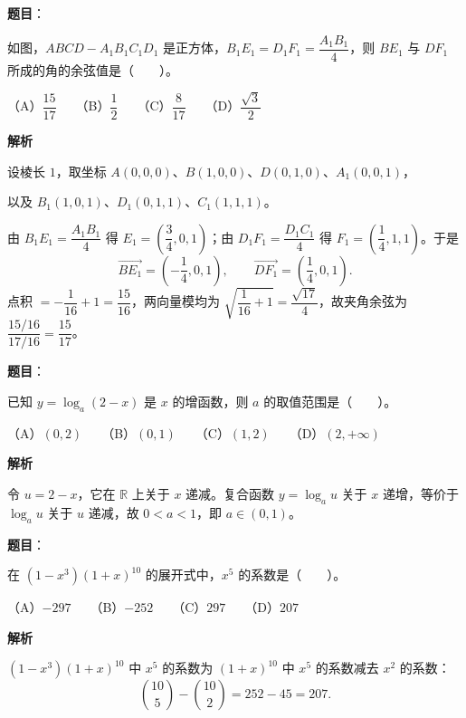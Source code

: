 \begin{answer}

\textbf{题目}：

如图，$ABCD-A_1B_1C_1D_1$ 是正方体，$B_1E_1=D_1F_1=\dfrac{A_1B_1}{4}$，则 $BE_1$ 与 $DF_1$ 所成的角的余弦值是\mbox{（　　）}。
\nopagebreak[4]
\begin{center}\end{center}
\nopagebreak[4]
（A）$\dfrac{15}{17}$　　（B）$\dfrac12$　　（C）$\dfrac8{17}$　　（D）$\dfrac{\sqrt3}{2}$

\textbf{解析}

设棱长 $1$，取坐标 $A(0,0,0)$、$B(1,0,0)$、$D(0,1,0)$、$A_1(0,0,1)$，

以及 $B_1(1,0,1)$、$D_1(0,1,1)$、$C_1(1,1,1)$。

由 $B_1E_1=\dfrac{A_1B_1}{4}$ 得 $E_1=\left(\dfrac34,0,1\right)$；由 $D_1F_1=\dfrac{D_1C_1}{4}$ 得 $F_1=\left(\dfrac14,1,1\right)$。于是
\nopagebreak[4]
\[\overrightarrow{BE_1}=\left(-\dfrac14,0,1\right),\qquad \overrightarrow{DF_1}=\left(\dfrac14,0,1\right).\]
点积 $=-\dfrac1{16}+1=\dfrac{15}{16}$，两向量模均为 $\sqrt{\dfrac1{16}+1}=\dfrac{\sqrt{17}}{4}$，故夹角余弦为 $\dfrac{15/16}{17/16}=\dfrac{15}{17}$。


\end{answer}
\begin{answer}

\textbf{题目}：

已知 $y=\log_a(2-x)$ 是 $x$ 的增函数，则 $a$ 的取值范围是\mbox{（　　）}。

（A）$(0,2)$　　（B）$(0,1)$　　（C）$(1,2)$　　（D）$(2,+\infty)$

\textbf{解析}

令 $u=2-x$，它在 $\mathbb R$ 上关于 $x$ 递减。复合函数 $y=\log_a u$ 关于 $x$ 递增，等价于 $\log_a u$ 关于 $u$ 递减，故 $0<a<1$，即 $a\in(0,1)$。


\end{answer}
\begin{answer}

\textbf{题目}：

在 $(1-x^3)(1+x)^{10}$ 的展开式中，$x^5$ 的系数是\mbox{（　　）}。

（A）$-297$　　（B）$-252$　　（C）$297$　　（D）$207$

\textbf{解析}

$(1-x^3)(1+x)^{10}$ 中 $x^5$ 的系数为 $(1+x)^{10}$ 中 $x^5$ 的系数减去 $x^2$ 的系数：
\nopagebreak[4]
\[\binom{10}{5}-\binom{10}{2}=252-45=207.\]


\end{answer}
